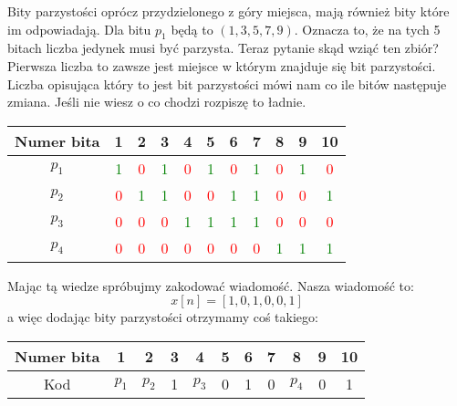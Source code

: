 \documentclass{article}
\begin{document}
Bity parzystości oprócz przydzielonego z góry miejsca, mają również bity które im odpowiadają.
Dla bitu $p_1$ będą to $(1, 3, 5, 7, 9)$. Oznacza to, że na tych 5 bitach liczba jedynek musi być
parzysta. Teraz pytanie skąd wziąć ten zbiór? Pierwsza liczba to zawsze jest miejsce
w którym znajduje się bit parzystości. Liczba opisująca który to jest bit parzystości mówi nam co
ile bitów następuje zmiana. Jeśli nie wiesz o co chodzi rozpiszę to ładnie.
\begin{center}
    \begin{tabular}{|c|c|c|c|c|c|c|c|c|c|c|}
        \hline
        Numer bita & 1 & 2 & 3 & 4 & 5 & 6 & 7 & 8 & 9 & 10 \\
        \hline
        $p_1$ & \textcolor{green}{1} & \textcolor{red}{0} & \textcolor{green}{1} & \textcolor{red}{0} & \textcolor{green}{1} & \textcolor{red}{0} & \textcolor{green}{1} & \textcolor{red}{0} & \textcolor{green}{1} & \textcolor{red}{0} \\
        \hline
        $p_2$ & \textcolor{red}{0} & \textcolor{green}{1} & \textcolor{green}{1} & \textcolor{red}{0} & \textcolor{red}{0} & \textcolor{green}{1} & \textcolor{green}{1} & \textcolor{red}{0} & \textcolor{red}{0} & \textcolor{green}{1} \\
        \hline
        $p_3$ & \textcolor{red}{0} & \textcolor{red}{0} & \textcolor{red}{0} & \textcolor{green}{1} & \textcolor{green}{1} & \textcolor{green}{1} & \textcolor{green}{1} & \textcolor{red}{0} & \textcolor{red}{0} & \textcolor{red}{0} \\
        \hline
        $p_4$ & \textcolor{red}{0} & \textcolor{red}{0} & \textcolor{red}{0} & \textcolor{red}{0} & \textcolor{red}{0} & \textcolor{red}{0} & \textcolor{red}{0} & \textcolor{green}{1} & \textcolor{green}{1} & \textcolor{green}{1} \\
        \hline
    \end{tabular}
\end{center}
Mając tą wiedze spróbujmy zakodować wiadomość. Nasza wiadomość to:
\[
    x[n]=[1,0,1,0,0,1]
\]
a więc dodając bity parzystości otrzymamy coś takiego:
\begin{center}
        \begin{tabular}{|c|c|c|c|c|c|c|c|c|c|c|}
        \hline
        Numer bita & 1 & 2 & 3 & 4 & 5 & 6 & 7 & 8 & 9 & 10 \\
        \hline
        Kod & $p_1$ & $p_2$ & 1 & $p_3$ & 0 & 1 & 0 & $p_4$ & 0 & 1 \\
        \hline
    \end{tabular}
\end{center}
\end{document}
